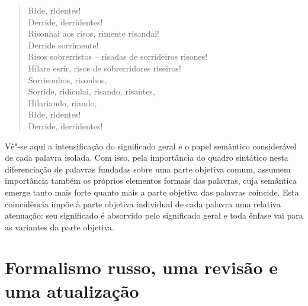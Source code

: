 \begin{verse}
Ride, ridentes! \\
Derride, derridentes! \\
Risonhai aos risos, rimente risandai! \\
Derride sorrimente! \\
Risos sobrerristos -- risadas de sorrideiros \qb{}risones! \\
Hílare esrir, risos de sobrerridores riseiros! \\
Sorrisonhos, risonhos, \\
Sorride, ridiculai, risando, risantes, \\
Hilariando, riando, \\
Ride, ridentes! \\
Derride, derridentes!
\end{verse}

Vê"-se aqui a intensificação do significado geral e o papel semântico
considerável de cada palavra isolada. Com isso, pela importância do
quadro sintático nesta diferenciação de palavras fundadas sobre uma
parte objetiva comum, assumem importância também os próprios elementos
formais das palavras, cuja semântica emerge tanto mais forte quanto mais
a parte objetiva das palavras coincide. Esta coincidência impõe à parte
objetiva individual de cada palavra uma relativa atenuação: seu
significado é absorvido pelo significado geral e toda ênfase vai para as
variantes da parte objetiva.


\chapter{Formalismo russo, uma revisão e uma atualização}

